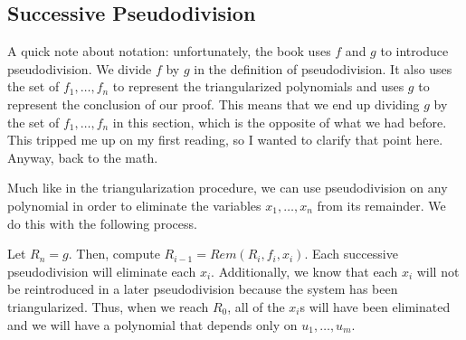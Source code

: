 \documentclass[12pt]{article}
\theoremstyle{plain}
\theoremstyle{definition}
\theoremstyle{remark}
\begin{document}
\subsection{Successive Pseudodivision}

A quick note about notation: unfortunately, the book uses $f$ and $g$ to introduce pseudodivision. We divide $f$ by $g$ in the definition of pseudodivision.
It also uses the set of $f_1,\dots,f_n$ to represent the triangularized polynomials and uses $g$ to represent the conclusion of our proof.
This means that we end up dividing $g$ by the set of $f_1,\dots,f_n$ in this section, which is the opposite of what we had before. 
This tripped me up on my first reading, so I wanted to clarify that point here. Anyway, back to the math.

Much like in the triangularization procedure, we can use pseudodivision on any polynomial in order to eliminate the variables $x_1,\dots,x_n$ from its remainder.
We do this with the following process.

Let $R_n = g$. Then, compute $R_{i-1} = Rem(R_i,f_i,x_i)$. Each successive pseudodivision will eliminate each $x_i$. 
Additionally, we know that each $x_i$ will not be reintroduced in a later pseudodivision because the system has been triangularized.
Thus, when we reach $R_0$, all of the $x_i$s will have been eliminated and we will have a polynomial that depends only on $u_1,\dots,u_m$.
\end{document}

